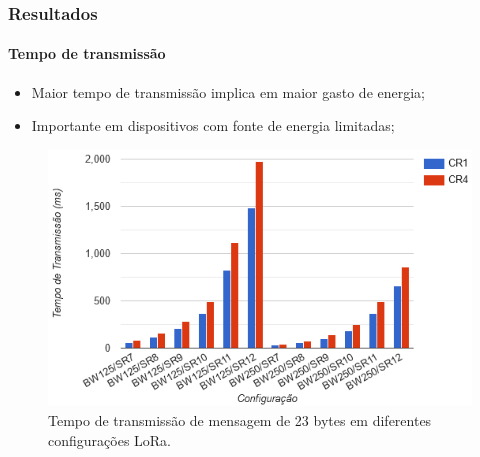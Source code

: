 \documentclass[aspectratio=169]{beamer}
\begin{document}
\begin{frame}

\frametitle{Resultados}
\framesubtitle{Tempo de transmissão}

\begin{itemize}
    \item Maior tempo de transmissão implica em maior gasto de energia;
    \item Importante em dispositivos com fonte de energia limitadas;
\end{itemize}

\begin{figure}
  \centering
  \includegraphics[scale=0.55]{img/Time.png}
  \caption{Tempo de transmissão de mensagem de 23 bytes em diferentes configurações LoRa.}
\end{figure}

\end{frame}
\end{document}
